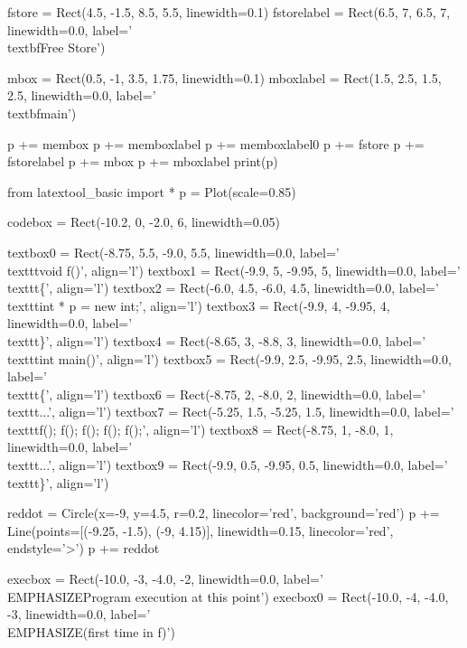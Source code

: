 \begin{python}
fstore = Rect(4.5, -1.5, 8.5, 5.5, linewidth=0.1)
fstorelabel = Rect(6.5, 7, 6.5, 7, linewidth=0.0, label='\\textbf{Free Store}')

mbox = Rect(0.5, -1, 3.5, 1.75, linewidth=0.1)
mboxlabel = Rect(1.5, 2.5, 1.5, 2.5, linewidth=0.0, label='\\textbf{main}')

p += membox
p += memboxlabel
p += memboxlabel0
p += fstore
p += fstorelabel
p += mbox
p += mboxlabel
print(p)
\end{python}

\begin{python}
from latextool_basic import *
p = Plot(scale=0.85)

codebox = Rect(-10.2, 0, -2.0, 6, linewidth=0.05)

textbox0 = Rect(-8.75, 5.5, -9.0, 5.5, linewidth=0.0, label='\\texttt{void f()}', align='l')
textbox1 = Rect(-9.9, 5, -9.95, 5, linewidth=0.0, label='\\texttt{\{}', align='l')
textbox2 = Rect(-6.0, 4.5, -6.0, 4.5, linewidth=0.0, label='\\texttt{int * p = new int;}', align='l')
textbox3 = Rect(-9.9, 4, -9.95, 4, linewidth=0.0, label='\\texttt{\}}', align='l')
textbox4 = Rect(-8.65, 3, -8.8, 3, linewidth=0.0, label='\\texttt{int main()}', align='l')
textbox5 = Rect(-9.9, 2.5, -9.95, 2.5, linewidth=0.0, label='\\texttt{\{}', align='l')
textbox6 = Rect(-8.75, 2, -8.0, 2, linewidth=0.0, label='\\texttt{...}', align='l')
textbox7 = Rect(-5.25, 1.5, -5.25, 1.5, linewidth=0.0, label='\\texttt{f(); f(); f(); f(); f();}', align='l')
textbox8 = Rect(-8.75, 1, -8.0, 1, linewidth=0.0, label='\\texttt{...}', align='l')
textbox9 = Rect(-9.9, 0.5, -9.95, 0.5, linewidth=0.0, label='\\texttt{\}}', align='l')

reddot = Circle(x=-9, y=4.5, r=0.2, linecolor='red', background='red')
p += Line(points=[(-9.25, -1.5), (-9, 4.15)], linewidth=0.15, linecolor='red', endstyle='>')
p += reddot

execbox = Rect(-10.0, -3, -4.0, -2, linewidth=0.0,
               label='\\EMPHASIZE{Program execution at this point}')
execbox0 = Rect(-10.0, -4, -4.0, -3, linewidth=0.0,
               label='\\EMPHASIZE{(first time in f)}')


\end{python}
